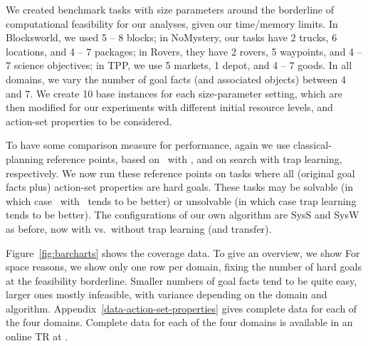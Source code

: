 We created benchmark tasks with size parameters around the borderline
of computational feasibility for our analyses, given our time/memory
limits. In Blocksworld, we used 5 -- 8 blocks; in NoMystery, our tasks
have 2 trucks, 6 locations, and 4 -- 7 packages; in Rovers, they have
2 rovers, 5 waypoints, and 4 -- 7 science objectives; in TPP, we use 5
markets, 1 depot, and 4 -- 7 goods. In all domains, we vary the number
of goal facts (and associated objects) between 4 and 7. We create 10
base instances for each size-parameter setting, which are then
modified for our experiments with different initial resource levels,
and action-set properties to be considered.
%

To have some comparison measure for performance, again we use
classical-planning reference points, based on \astar\ with \hlmcut,
and on search with trap learning, respectively. We now run these
reference points on tasks where all (original goal facts plus)
action-set properties are hard goals. These tasks may be solvable (in
which case \astar\ with \hlmcut\ tends to be better) or unsolvable (in
which case trap learning tends to be better). The configurations of
our own algorithm are SysS and SysW as before, now with vs.\ without
trap learning (and transfer).

Figure~\ref{fig:barcharts} shows the coverage
data. \ifdefined\suppflagdefined To give an overview, we show \else
For space reasons, we show only \fi one row per domain, fixing the
number of hard goals at the feasibility borderline. Smaller numbers of
goal facts tend to be quite easy, larger ones mostly infeasible, with
variance depending on the domain and
algorithm. \ifdefined\suppflagdefined
Appendix~\ref{data-action-set-properties} gives complete data for each
of the four domains. \else Complete data for each of the four domains
is available in an online TR at . \fi


